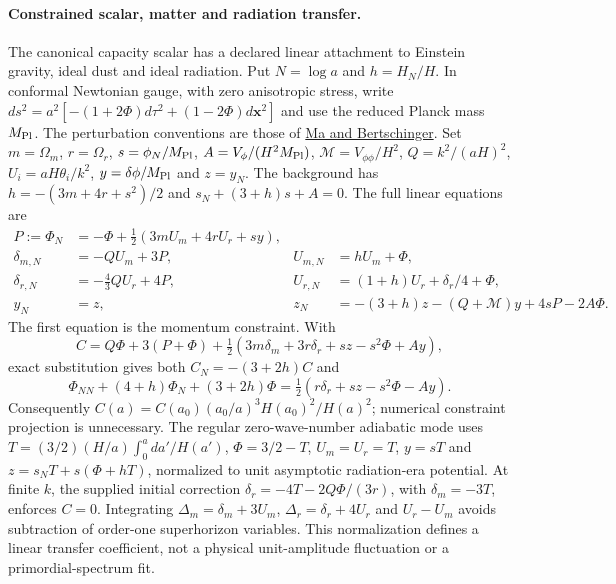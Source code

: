 \documentclass[11pt]{article}
\theoremstyle{remark}
\theoremstyle{plain}
\begin{document}
\paragraph{Constrained scalar, matter and radiation transfer.}
The canonical capacity scalar has a declared linear attachment to
Einstein gravity, ideal dust and ideal radiation. Put $N=\log a$ and $h=H_N/H$.
In conformal Newtonian gauge, with zero anisotropic stress, write
$ds^2=a^2[-(1+2\Phi)d\tau^2+(1-2\Phi)d\mathbf x^2]$ and use the reduced
Planck mass $M_{\rm Pl}$. The perturbation conventions are those of
\href{https://arxiv.org/abs/astro-ph/9506072}{Ma and Bertschinger}.
Set $m=\Omega_m$, $r=\Omega_r$, $s=\phi_N/M_{\rm Pl}$,
$A=V_\phi/(H^2M_{\rm Pl})$, $\mathcal M=V_{\phi\phi}/H^2$,
$Q=k^2/(aH)^2$, $U_i=aH\theta_i/k^2$, $y=\delta\phi/M_{\rm Pl}$ and
$z=y_N$. The background has
$h=-(3m+4r+s^2)/2$ and $s_N+(3+h)s+A=0$.
The full linear equations are
\begin{align*}
 P:=\Phi_N&=-\Phi+\tfrac12(3mU_m+4rU_r+sy),\\
 \delta_{m,N}&=-QU_m+3P,& U_{m,N}&=hU_m+\Phi,\\
 \delta_{r,N}&=-\tfrac43QU_r+4P,& U_{r,N}&=(1+h)U_r+\delta_r/4+\Phi,\\
 y_N&=z,&z_N&=-(3+h)z-(Q+\mathcal M)y+4sP-2A\Phi.
\end{align*}
The first equation is the momentum constraint. With
\[
 C=Q\Phi+3(P+\Phi)
   +\tfrac12(3m\delta_m+3r\delta_r+sz-s^2\Phi+Ay),
\]
exact substitution gives both $C_N=-(3+2h)C$ and
\[
 \Phi_{NN}+(4+h)\Phi_N+(3+2h)\Phi
 =\tfrac12(r\delta_r+sz-s^2\Phi-Ay).
\]
Consequently $C(a)=C(a_0)(a_0/a)^3H(a_0)^2/H(a)^2$; numerical
constraint projection is unnecessary. The regular zero-wave-number
adiabatic mode uses
$T=(3/2)(H/a)\int_0^a da'/H(a')$, $\Phi=3/2-T$, $U_m=U_r=T$,
$y=sT$ and $z=s_NT+s(\Phi+hT)$, normalized to unit asymptotic
radiation-era potential. At finite $k$, the supplied initial correction
$\delta_r=-4T-2Q\Phi/(3r)$, with $\delta_m=-3T$, enforces $C=0$.
Integrating $\Delta_m=\delta_m+3U_m$, $\Delta_r=\delta_r+4U_r$ and
$U_r-U_m$ avoids subtraction of order-one superhorizon variables.
This normalization defines a linear transfer coefficient, not a physical
unit-amplitude fluctuation or a primordial-spectrum fit.
\end{document}
